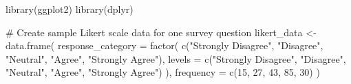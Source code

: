 \documentclass[
  letterpaper,
  DIV=11,
  numbers=noendperiod]{scrartcl}
\newenvironment{Shaded}{\begin{snugshade}}{\end{snugshade}}
\newcommand{\AttributeTok}[1]{\textcolor[rgb]{0.40,0.45,0.13}{#1}}
\newcommand{\CommentTok}[1]{\textcolor[rgb]{0.37,0.37,0.37}{#1}}
\newcommand{\DecValTok}[1]{\textcolor[rgb]{0.68,0.00,0.00}{#1}}
\newcommand{\FunctionTok}[1]{\textcolor[rgb]{0.28,0.35,0.67}{#1}}
\newcommand{\NormalTok}[1]{\textcolor[rgb]{0.00,0.23,0.31}{#1}}
\newcommand{\OtherTok}[1]{\textcolor[rgb]{0.00,0.23,0.31}{#1}}
\newcommand{\StringTok}[1]{\textcolor[rgb]{0.13,0.47,0.30}{#1}}
\begin{document}
\begin{Shaded}
\begin{Highlighting}[]
\FunctionTok{library}\NormalTok{(ggplot2)}
\FunctionTok{library}\NormalTok{(dplyr)}

\CommentTok{\# Create sample Likert scale data for one survey question}
\NormalTok{likert\_data }\OtherTok{\textless{}{-}} \FunctionTok{data.frame}\NormalTok{(}
  \AttributeTok{response\_category =} \FunctionTok{factor}\NormalTok{(}
    \FunctionTok{c}\NormalTok{(}\StringTok{"Strongly Disagree"}\NormalTok{, }\StringTok{"Disagree"}\NormalTok{, }
      \StringTok{"Neutral"}\NormalTok{, }\StringTok{"Agree"}\NormalTok{, }\StringTok{"Strongly Agree"}\NormalTok{),}
    \AttributeTok{levels =} \FunctionTok{c}\NormalTok{(}\StringTok{"Strongly Disagree"}\NormalTok{, }\StringTok{"Disagree"}\NormalTok{, }
               \StringTok{"Neutral"}\NormalTok{, }\StringTok{"Agree"}\NormalTok{, }\StringTok{"Strongly Agree"}\NormalTok{)}
\NormalTok{  ),}
  \AttributeTok{frequency =} \FunctionTok{c}\NormalTok{(}\DecValTok{15}\NormalTok{, }\DecValTok{27}\NormalTok{, }\DecValTok{43}\NormalTok{, }\DecValTok{85}\NormalTok{, }\DecValTok{30}\NormalTok{)}
\NormalTok{)}


\end{Highlighting}
\end{Shaded}
\end{document}
